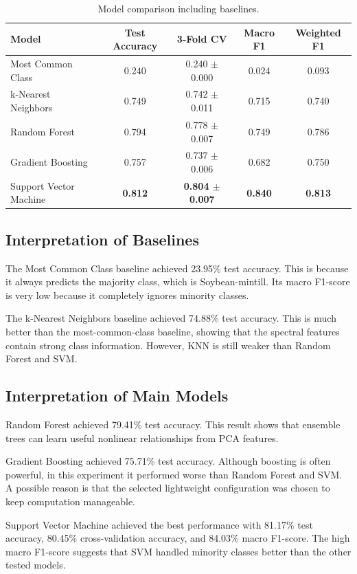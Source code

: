 \documentclass[12pt,a4paper]{article}
\begin{document}
\begin{table}[H]
\centering
\begin{tabular}{lcccc}
\toprule
\textbf{Model} & \textbf{Test Accuracy} & \textbf{3-Fold CV} & \textbf{Macro F1} & \textbf{Weighted F1} \\
\midrule
Most Common Class & 0.240 & 0.240 $\pm$ 0.000 & 0.024 & 0.093 \\
k-Nearest Neighbors & 0.749 & 0.742 $\pm$ 0.011 & 0.715 & 0.740 \\
Random Forest & 0.794 & 0.778 $\pm$ 0.007 & 0.749 & 0.786 \\
Gradient Boosting & 0.757 & 0.737 $\pm$ 0.006 & 0.682 & 0.750 \\
Support Vector Machine & \textbf{0.812} & \textbf{0.804 $\pm$ 0.007} & \textbf{0.840} & \textbf{0.813} \\
\bottomrule
\end{tabular}
\caption{Model comparison including baselines.}
\end{table}

\subsection{Interpretation of Baselines}

The Most Common Class baseline achieved 23.95\% test accuracy. This is because it always predicts the majority class, which is Soybean-mintill. Its macro F1-score is very low because it completely ignores minority classes.

The k-Nearest Neighbors baseline achieved 74.88\% test accuracy. This is much better than the most-common-class baseline, showing that the spectral features contain strong class information. However, KNN is still weaker than Random Forest and SVM.

\subsection{Interpretation of Main Models}

Random Forest achieved 79.41\% test accuracy. This result shows that ensemble trees can learn useful nonlinear relationships from PCA features.

Gradient Boosting achieved 75.71\% test accuracy. Although boosting is often powerful, in this experiment it performed worse than Random Forest and SVM. A possible reason is that the selected lightweight configuration was chosen to keep computation manageable.

Support Vector Machine achieved the best performance with 81.17\% test accuracy, 80.45\% cross-validation accuracy, and 84.03\% macro F1-score. The high macro F1-score suggests that SVM handled minority classes better than the other tested models.
\end{document}
